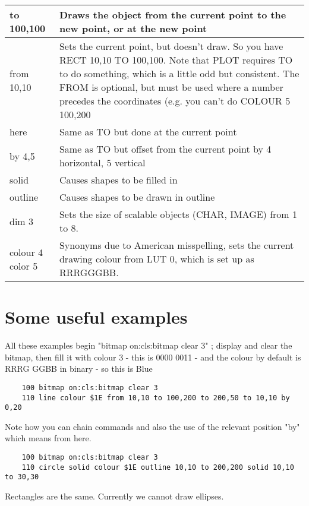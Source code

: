 \begin{tabular} {|p{1.0in}|p{4.5in}|}
\hline
to 100,100 & Draws the object from the current point to the new point, or at the new point \\
\hline
from 10,10 & Sets the current point, but doesn’t draw. So you have RECT 10,10 TO 100,100. Note that PLOT requires TO to do something, which is a little odd but consistent. The FROM is optional, but must be used where a number precedes the coordinates (e.g. you can’t do COLOUR 5 100,200 \\
\hline
here & Same as TO but done at the current point \\
\hline
by 4,5 & Same as TO but offset from the current point by 4 horizontal, 5 vertical \\
\hline
solid & Causes shapes to be filled in\\
\hline
outline & Causes shapes to be drawn in outline\\
\hline
dim 3 & Sets the size of scalable objects (CHAR, IMAGE) from 1 to 8.\\
\hline
colour 4 color 5 & Synonyms due to American misspelling, sets the current drawing colour from LUT 0, which is set up as  RRRGGGBB. \\
\hline
\end{tabular}

\section{Some useful examples}

All these examples begin "bitmap on:cls:bitmap clear 3" ; display and clear the bitmap, then fill it with colour 3 - this is 0000 0011 - and the colour by default is RRRG GGBB in binary - so this is Blue

\begin{verbatim}
	100 bitmap on:cls:bitmap clear 3
	110 line colour $1E from 10,10 to 100,200 to 200,50 to 10,10 by 0,20	
\end{verbatim}

Note how you can chain commands  and also the use of the relevant position "by" which means from here.

\begin{verbatim}
	100 bitmap on:cls:bitmap clear 3
	110 circle solid colour $1E outline 10,10 to 200,200 solid 10,10 to 30,30
\end{verbatim}


Rectangles are the same. Currently we cannot draw ellipses.

